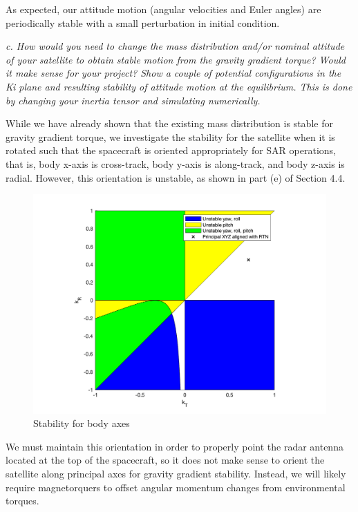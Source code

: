 As expected, our attitude motion (angular velocities and Euler angles) are periodically stable with a small perturbation in initial condition.


\textit{c. How would you need to change the mass distribution and/or nominal attitude of your satellite to obtain stable motion from the gravity gradient torque? Would it make sense for your project? Show a couple of potential configurations in the Ki plane and resulting stability of attitude motion at the equilibrium. This is done by changing your inertia tensor and simulating numerically.}

While we have already shown that the existing mass distribution is stable for gravity gradient torque, we investigate the stability for the satellite when it is rotated such that the spacecraft is oriented appropriately for SAR operations, that is, body x-axis is cross-track, body y-axis is along-track, and body z-axis is radial. However, this orientation is unstable, as shown in part (e) of Section 4.4.

\begin{figure}[H]
\centering
\includegraphics[scale=0.6]{Images/ps5_problem1c.png}
\caption{Stability for body axes}
\label{fig:ps5_problem1c}
\end{figure}

We must maintain this orientation in order to properly point the radar antenna located at the top of the spacecraft, so it does not make sense to orient the satellite along principal axes for gravity gradient stability. Instead, we will likely require magnetorquers to offset angular momentum changes from environmental torques.


